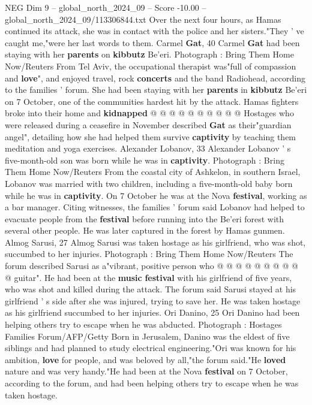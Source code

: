 \begin{textsample}{NEG Dim 9 – global\_north\_2024\_09 – Score -10.00 – global\_north\_2024\_09/113306844.txt}
Over the next four hours, as Hamas continued its attack, she was in contact with the police and her sisters."They ' ve caught me,"were her last words to them.
Carmel \textbf{Gat}, 40 Carmel \textbf{Gat} had been staying with her \textbf{parents} on \textbf{kibbutz} Be'eri.
Photograph : Bring Them Home Now/Reuters From Tel Aviv, the occupational therapist was"full of compassion and \textbf{love}", and enjoyed travel, rock \textbf{concerts} and the band Radiohead, according to the families ' forum.
She had been staying with her \textbf{parents} in \textbf{kibbutz} Be'eri on 7 October, one of the communities hardest hit by the attack.
Hamas fighters broke into their home and \textbf{kidnapped} @ @ @ @ @ @ @ @ @ @ Hostages who were released during a ceasefire in November described \textbf{Gat} as their"guardian angel", detailing how she had helped them survive \textbf{captivity} by teaching them meditation and yoga exercises.
Alexander Lobanov, 33 Alexander Lobanov ' s five-month-old son was born while he was in \textbf{captivity}.
Photograph : Bring Them Home Now/Reuters From the coastal city of Ashkelon, in southern Israel, Lobanov was married with two children, including a five-month-old baby born while he was in \textbf{captivity}.
On 7 October he was at the Nova \textbf{festival}, working as a bar manager.
Citing witnesses, the families ' forum said Lobanov had helped to evacuate people from the \textbf{festival} before running into the Be'eri forest with several other people.
He was later captured in the forest by Hamas gunmen.
Almog Sarusi, 27 Almog Sarusi was taken hostage as his girlfriend, who was shot, succumbed to her injuries.
Photograph : Bring Them Home Now/Reuters The forum described Sarusi as a"vibrant, positive person who @ @ @ @ @ @ @ @ @ @ guitar".
He had been at the \textbf{music} \textbf{festival} with his girlfriend of five years, who was shot and killed during the attack.
The forum said Sarusi stayed at his girlfriend ' s side after she was injured, trying to save her.
He was taken hostage as his girlfriend succumbed to her injuries.
Ori Danino, 25 Ori Danino had been helping others try to escape when he was abducted.
Photograph : Hostages Families Forum/AFP/Getty Born in Jerusalem, Danino was the eldest of five siblings and had planned to study electrical engineering."Ori was known for his ambition, \textbf{love} for people, and was beloved by all,"the forum said."He \textbf{loved} nature and was very handy."He had been at the Nova \textbf{festival} on 7 October, according to the forum, and had been helping others try to escape when he was taken hostage.

\end{textsample}
